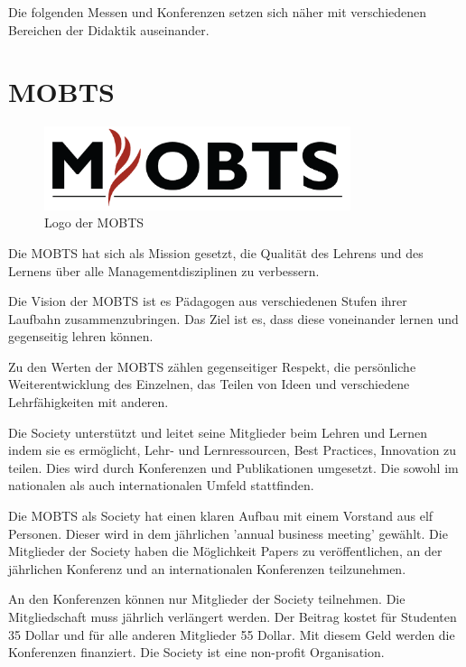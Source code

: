 Die folgenden Messen und Konferenzen setzen sich näher mit verschiedenen Bereichen der Didaktik auseinander. 
\section{\ac{MOBTS}}


\begin{figure}[h]
    \centering
    \includegraphics[width=0.8\textwidth]{img/mobtslogo.png}
    \caption[Logo: \ac{MOBTS}]{Logo der \ac{MOBTS}}
    \label{fig:LOGO_MOBTS}
\end{figure}

Die \ac{MOBTS} hat sich als Mission gesetzt, die Qualität des Lehrens und des Lernens über alle Managementdisziplinen zu verbessern. \autocite[Vgl.][]{MOBTS.452021} 

Die Vision der \ac{MOBTS} ist es Pädagogen aus verschiedenen Stufen ihrer Laufbahn zusammenzubringen. Das Ziel ist es, dass diese voneinander lernen und gegenseitig lehren können. \autocite[Vgl.][]{MOBTS.452021} 

Zu den Werten der \ac{MOBTS} zählen gegenseitiger Respekt, die persönliche Weiterentwicklung des Einzelnen, das Teilen von Ideen und verschiedene Lehrfähigkeiten mit anderen. \autocite[Vgl.][]{MOBTSExecutiveCommitee.432021} 

Die Society unterstützt und leitet seine Mitglieder beim Lehren und Lernen indem sie es ermöglicht, Lehr- und Lernressourcen, Best Practices, Innovation zu teilen. Dies wird durch Konferenzen und Publikationen umgesetzt. \autocite[Vgl.][]{MOBTS.452021} Die sowohl im nationalen als auch internationalen Umfeld stattfinden. 

Die \ac{MOBTS} als Society hat einen klaren Aufbau mit einem Vorstand aus elf Personen. Dieser wird in dem jährlichen 'annual business meeting' gewählt. Die Mitglieder der Society haben die Möglichkeit Papers zu veröffentlichen, an der jährlichen Konferenz und an internationalen Konferenzen teilzunehmen. \autocite[Vgl.][]{MOBTS.452021} 

An den Konferenzen können nur Mitglieder der Society teilnehmen. Die Mitgliedschaft muss jährlich verlängert werden. Der Beitrag kostet für Studenten 35 Dollar und für alle anderen Mitglieder 55 Dollar. \autocite[Vgl.][]{MOBTS.432021e} Mit diesem Geld werden die Konferenzen finanziert. Die Society ist eine non-profit Organisation.  

